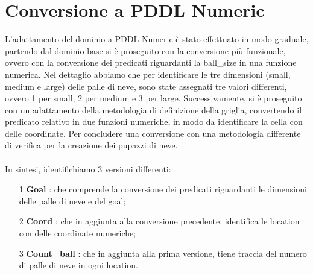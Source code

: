 \documentclass{article}
\begin{document}
\section*{Conversione a PDDL Numeric}
L'adattamento del dominio a PDDL Numeric è stato effettuato in modo graduale, partendo dal dominio base si è proseguito con la conversione più funzionale, ovvero con la conversione 
dei predicati riguardanti la ball\_size in una funzione numerica. Nel dettaglio abbiamo che per identificare le tre dimensioni (small, medium e large) delle palle di neve, sono state 
assegnati tre valori differenti, ovvero 1 per small, 2 per medium e 3 per large. Successivamente, si è proseguito con un adattamento della metodologia di definizione
della griglia, convertendo il predicato relativo in due funzioni numeriche, in modo da identificare la cella con delle coordinate.
Per concludere una conversione con una metodologia differente di verifica per la creazione dei pupazzi di neve.\\ \\
In sintesi, identifichiamo 3 versioni differenti:\vspace{-0.15cm}
\begin{itemize}
    \item[1] \textbf{Goal} : che comprende la conversione dei predicati riguardanti le dimensioni delle palle di neve e del goal;\vspace{-0.15cm}
    \item[2] \textbf{Coord} : che in aggiunta alla conversione precedente, identifica le location con delle coordinate numeriche;\vspace{-0.15cm}
    \item[3] \textbf{Count\_ball} : che in aggiunta alla prima versione, tiene traccia del numero di palle di neve in ogni location.\vspace{-0.15cm}
\end{itemize}
\phantom{a}\\
\phantom{a}
\end{document}
